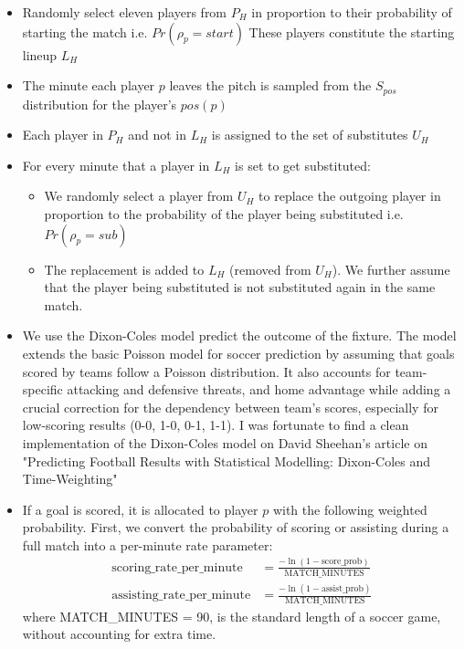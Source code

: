 \begin{itemize}
    \item Randomly select eleven players from $P_H$ in proportion to their probability of starting the match i.e. $Pr(\rho_p = start)$ These players constitute the starting lineup $L_H$
    \item The minute each player $p$ leaves the pitch is sampled from the $S_{pos}$ distribution for the player's $pos(p)$
    \item Each player in $P_H$ and not in $L_H$ is assigned to the set of substitutes $U_H$
    \item For every minute that a player in $L_H$ is set to get substituted:
    \begin{itemize}
        \item We randomly select a player from $U_H$ to replace the outgoing player in proportion to the probability of the player being substituted i.e. $Pr(\rho_p = sub)$
        \item The replacement is added to $L_H$ (removed from $U_H$). We further assume that the player being substituted is not substituted again in the same match.
    \end{itemize}
    \item We use the Dixon-Coles model \cite{dixon1997} predict the outcome of the fixture. The model extends the basic Poisson model for soccer prediction by assuming that goals scored by teams follow a Poisson distribution. It also accounts for team-specific attacking and defensive threats, and home advantage while adding a crucial correction for the dependency between team's scores, especially for low-scoring results (0-0, 1-0, 0-1, 1-1). I was fortunate to find a clean implementation of the Dixon-Coles model on David Sheehan's article on "Predicting Football Results with Statistical Modelling: Dixon-Coles and Time-Weighting" \cite{sheehan2018}
    \item If a goal is scored, it is allocated to player $p$ with the following weighted probability. First, we convert the probability of scoring or assisting during a full match into a per-minute rate parameter:
    \begin{align}
    \text{scoring\_rate\_per\_minute} &= \frac{-\ln(1 - \text{score\_prob})}{\text{MATCH\_MINUTES}} \\
    \text{assisting\_rate\_per\_minute} &= \frac{-\ln(1 - \text{assist\_prob})}{\text{MATCH\_MINUTES}}
    \end{align}
    where MATCH\_MINUTES = 90, is the standard length of a soccer game, without accounting for extra time.


\end{itemize}
